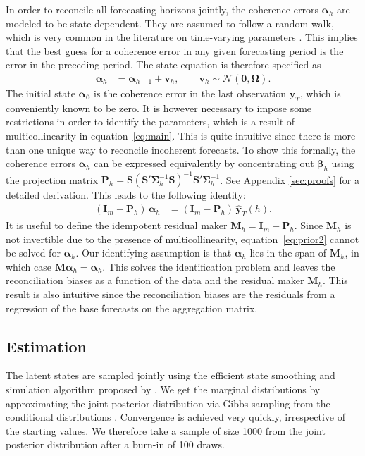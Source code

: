 \documentclass[a4paper,fleqn,11pt]{article}
\begin{document}
In order to reconcile all forecasting horizons jointly, the coherence errors $\boldsymbol{\alpha}_h$ are modeled to be state dependent. They are assumed to follow a random walk, which is very common in the literature on time-varying parameters \citep[see for instance][and references therein]{Primiceri2005}. This implies that the best guess for a coherence error in any given forecasting period is the error in the preceding period. The state equation is therefore specified as
\begin{align}
	\label{eq:state}
	\boldsymbol{\alpha}_h & = \boldsymbol{\alpha}_{h-1} + \textbf{v}_h, \qquad \textbf{v}_h \sim \mathcal{N}(\textbf{0}, \boldsymbol{\Omega}).
\end{align}
The initial state $\boldsymbol{\alpha_0}$ is the coherence error in the last observation $\textbf{y}_{T}$, which is conveniently known to be zero. It is however necessary to impose some restrictions in order to identify the parameters, which is a result of multicollinearity in equation~\eqref{eq:main}. This is quite intuitive since there is more than one unique way to reconcile incoherent forecasts. To show this formally, the coherence errors $\boldsymbol{\alpha}_h$ can be expressed equivalently by concentrating out $\boldsymbol{\beta}_h$ using the projection matrix $\textbf{P}_h = \textbf{S}(\textbf{S}'\boldsymbol{\Sigma}_h^{-1} \textbf{S})^{-1}\textbf{S}'\boldsymbol{\Sigma}_h^{-1}$. See Appendix \ref{sec:proofs} for a detailed derivation. This leads to the following identity:
\begin{align}
	\label{eq:prior2}
	(\textbf{I}_m - \textbf{P}_h)\, \boldsymbol{\alpha}_h &= (\textbf{I}_m - \textbf{P}_h)\, \mathbf{\hat{y}}_T(h).
\end{align}
It is useful to define the idempotent residual maker $\textbf{M}_h = \textbf{I}_m - \textbf{P}_h$. Since $\textbf{M}_h$ is not invertible due to the presence of multicollinearity, equation~\eqref{eq:prior2} cannot be solved for $\boldsymbol{\alpha}_h$. Our identifying assumption is that $\boldsymbol{\alpha}_h$ lies in the span of $\textbf{M}_h$, in which case $\textbf{M}\boldsymbol{\alpha}_h = \boldsymbol{\alpha}_h$. This solves the identification problem and leaves the reconciliation biases as a function of the data and the residual maker $\textbf{M}_h$. This result is also intuitive since the reconciliation biases are the residuals from a regression of the base forecasts on the aggregation matrix.


\subsection{Estimation}\label{sec:estim}
The latent states are sampled jointly using the efficient state smoothing and simulation algorithm proposed by \cite{Chan2009}. We get the marginal distributions by approximating the joint posterior distribution via Gibbs sampling from the conditional distributions \citep{Ando2010}. Convergence is achieved very quickly, irrespective of the starting values. We therefore take a sample of size 1000 from the joint posterior distribution after a burn-in of 100 draws.
\end{document}
